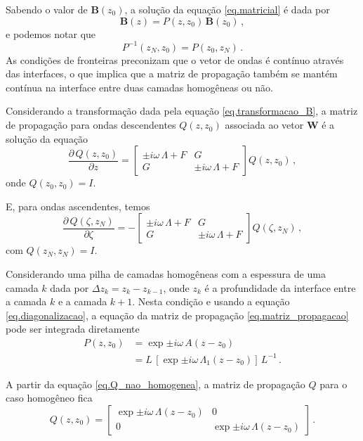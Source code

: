 Sabendo o valor de $\mathbf{B}(z_0)$, a solu\c{c}\~ao da equa\c{c}\~ao \ref{eq.matricial} \'e dada por
\begin{equation*}
\mathbf{B}(z)=P(z,z_0)\,\mathbf{B}(z_0)\,,
\end{equation*}
e podemos notar que 
\begin{equation*}
P^{-1}(z_N,z_0)=P(z_0,z_N)\,.
\end{equation*}
As condi\c{c}\~oes de fronteiras preconizam que o vetor de ondas \'e cont\'inuo atrav\'es das interfaces, o que implica que a matriz de propaga\c{c}\~ao tamb\'em se mant\'em cont\'inua na interface entre duas camadas homog\^eneas ou n\~ao.

Considerando a transforma\c{c}\~ao dada pela equa\c{c}\~ao \ref{eq.transformacao_B}, a matriz de propaga\c{c}\~ao para ondas descendentes $Q(z,z_0)$ associada ao vetor $\mathbf{W}$ \'e a solu\c{c}\~ao da equa\c{c}\~ao
\begin{equation}\label{eq.Q_nao_homogenea}
\frac{\partial\,Q(z,z_0)}{\partial z}=
\begin{bmatrix}
\pm i\omega\,\Lambda+F&G\\
G&\pm i\omega\,\Lambda+F
\end{bmatrix}
Q(z,z_0)\,,
\end{equation}
onde $Q(z_0,z_0)=I$.

E, para ondas ascendentes, temos
\begin{equation*}
\frac{\partial\,Q(\zeta,z_N)}{\partial \zeta}=-
\begin{bmatrix}
\pm i\omega\,\Lambda+F&G\\
G&\pm i\omega\,\Lambda+F
\end{bmatrix}
Q(\zeta,z_N)\,,
\end{equation*}
com $Q(z_N,z_N)=I$.

Considerando uma pilha de camadas homog\^eneas com a espessura de uma camada $k$ dada por $\Delta z_k=z_k-z_{k-1}$, onde $z_k$ \'e a profundidade da interface entre a camada $k$ e a camada $k+1$. Nesta condi\c{c}\~ao e usando a equa\c{c}\~ao \ref{eq.diagonalizacao}, a equa\c{c}\~ao da matriz de propaga\c{c}\~ao \ref{eq.matriz_propagacao} pode ser integrada diretamente  
\begin{align*}
P(z,z_0)&=\exp{\pm i\omega\,A(z-z_0)}\\
&=L\,\left[\exp{\pm i\omega\,\Lambda_1(z-z_0)}\right]\,L^{-1}\,.
\end{align*}

A partir da equa\c{c}\~ao \ref{eq.Q_nao_homogenea}, a matriz de propaga\c{c}\~ao $Q$ para o caso homog\^eneo fica
\begin{equation}\label{eq.Q(z,z_0)}
Q(z,z_0)=
\begin{bmatrix}
\exp{\pm i\omega\,\Lambda(z-z_0)}&0\\
0&\exp{\pm i\omega\,\Lambda(z-z_0)}
\end{bmatrix}\,.
\end{equation}

